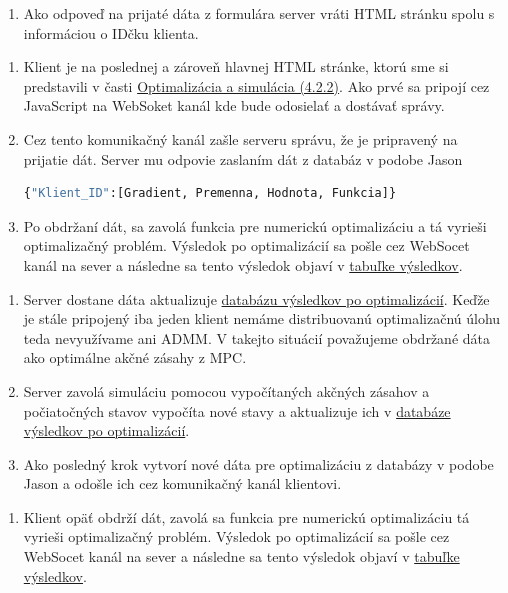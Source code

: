 \begin{description}
{\begin{enumerate}
{		}
		\item{
			Ako odpoveď na prijaté dáta z formulára server vráti HTML stránku spolu s informáciou o IDčku klienta.
		}
	\end{enumerate}
}
\item[3. Klient 1:]{\hfill
\begin{enumerate}
\item{
Klient je na poslednej a zároveň hlavnej HTML stránke, ktorú sme si predstavili v časti \hyperref[subse:OPTaSIM]{Optimalizácia a simulácia (4.2.2)}. Ako prvé sa pripojí cez JavaScript na WebSoket kanál kde bude odosielať a dostávať správy.
}
\item{
Cez tento komunikačný kanál zašle serveru správu, že je pripravený na prijatie dát. Server mu odpovie zaslaním dát z databáz v podobe Jason
\begin{lstlisting}[language=Python]
{"Klient_ID":[Gradient, Premenna, Hodnota, Funkcia]}
\end{lstlisting}
}
\item{Po obdržaní dát, sa zavolá funkcia pre numerickú optimalizáciu a tá vyrieši optimalizačný problém. Výsledok po optimalizácií sa pošle cez WebSocet kanál na sever a následne sa tento výsledok objaví v \hyperref[fig:Tabulka]{tabuľke výsledkov}.}
\end{enumerate}
}
\item[4. Server:]{\hfill
\begin{enumerate}
\item{
Server dostane dáta aktualizuje \hyperref[DB:WORKER_DATA]{databázu výsledkov po optimalizácií}. Keďže je stále pripojený iba jeden klient nemáme distribuovanú optimalizačnú úlohu teda nevyužívame ani ADMM. V takejto situácií považujeme obdržané dáta ako optimálne akčné zásahy z MPC.
}
\item{
Server zavolá simuláciu pomocou vypočítaných akčných zásahov a počiatočných stavov vypočíta nové stavy a aktualizuje ich v \hyperref[DB:WORKER_DATA]{databáze výsledkov po optimalizácií}.
}
\item{
Ako posledný krok vytvorí nové dáta pre optimalizáciu z databázy v podobe Jason a odošle ich cez komunikačný kanál klientovi.
}
\end{enumerate}
}
\item[5. Klient 1:]{\hfill
	\begin{enumerate}
		\item{Klient opäť obdrží dát, zavolá sa funkcia pre numerickú optimalizáciu tá vyrieši optimalizačný problém. Výsledok po optimalizácií sa pošle cez WebSocet kanál na sever a následne sa tento výsledok objaví v \hyperref[fig:Tabulka]{tabuľke výsledkov}.}

\end{enumerate}}
\end{description}
